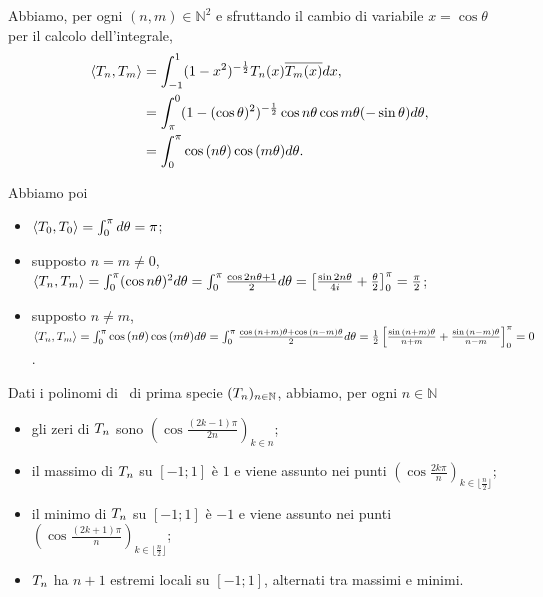 \Proof Abbiamo, per ogni $(n,m) \in \mathbb{N}^2$ e sfruttando il cambio di variabile $x = \cos{\theta}$ per il calcolo dell'integrale,
\begin{align*}
	\left \langle T_n , T_m \right \rangle
	&= \int_{-1}^1 (1 - x^2)^{-\frac{1}{2}}T_n(x)\overline{T_m(x)} dx,\\
	&= \int_\pi^0 (1 - (\cos{\theta})^2)^{-\frac{1}{2}} \cos{n \theta} \cos{m \theta} (- \sin{\theta}) d\theta,\\
	&= \int_0^\pi \cos{(n \theta)} \cos{(m \theta)} d\theta. 
\end{align*}
\par Abbiamo poi
\begin{itemize}
	\item $\left \langle T_0 , T_0 \right \rangle = \int_0^\pi d\theta = \pi$;
	\item supposto $n = m \neq 0$, $\left \langle T_n , T_m \right \rangle = \int_0^\pi (\cos{n \theta})^2 d\theta = \int_0^\pi \frac{\cos{2 n \theta} + 1}{2} d\theta = \left [\frac{\sin{2 n\theta}}{4i} + \frac{\theta}{2} \right ]_0^\pi = \frac{\pi}{2}$;
	\item supposto $n \neq m$, $\left \langle T_n , T_m \right \rangle = \int_0^\pi \cos{(n\theta)} \cos{(m\theta)} d\theta = \int_0^\pi \frac{\cos{(n + m)\theta} + \cos{(n - m)\theta}}{2} d\theta = \frac{1}{2} \left [ \frac{\sin{(n + m)\theta}}{n + m} + \frac{\sin{(n - m)\theta}}{n - m} \right ]_0^\pi = 0$. \EndProof
\end{itemize}
\begin{Corollary}
	Dati i polinomi di \Chebyshev\ di prima specie $(T_n)_{n \in \mathbb{N}}$, abbiamo, per ogni $n \in \mathbb{N}$
	\begin{itemize}
		\item gli zeri di $T_n$ sono $\left ( \cos{\frac{(2 k - 1)\pi}{2n}} \right )_{k \in n}$;
		\item il massimo di $T_n$ su $[-1;1]$ \`e $1$ e viene assunto nei punti $\left ( \cos \frac{2k\pi}{n} \right )_{k \in \lfloor \frac{n}{2} \rfloor}$;
		\item il minimo di $T_n$ su $[-1;1]$ \`e $- 1$ e viene assunto nei punti $\left ( \cos \frac{(2k + 1)\pi}{n} \right )_{k \in \lfloor \frac{n}{2} \rfloor}$;
		\item $T_n$ ha $n + 1$ estremi locali su $[-1;1]$, alternati tra massimi e minimi.
	\end{itemize}
\end{Corollary}
